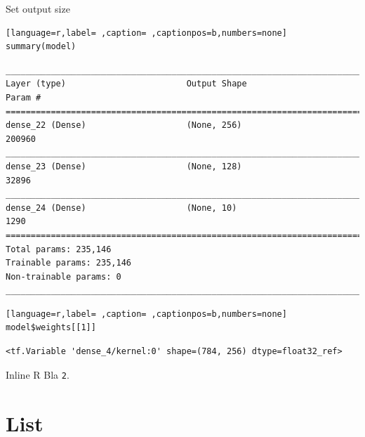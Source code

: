 \documentclass[table]{beamer}
\begin{document}
\begin{frame}[label={sec:org4520db5},fragile]{Set output size}
 \begin{lstlisting}[language=r,label= ,caption= ,captionpos=b,numbers=none]
summary(model)
\end{lstlisting}


{

\begin{verbatim}
________________________________________________________________________________
Layer (type)                        Output Shape                    Param #     
================================================================================
dense_22 (Dense)                    (None, 256)                     200960      
________________________________________________________________________________
dense_23 (Dense)                    (None, 128)                     32896       
________________________________________________________________________________
dense_24 (Dense)                    (None, 10)                      1290        
================================================================================
Total params: 235,146
Trainable params: 235,146
Non-trainable params: 0
________________________________________________________________________________
\end{verbatim}

}

\begin{lstlisting}[language=r,label= ,caption= ,captionpos=b,numbers=none]
model$weights[[1]]
\end{lstlisting}

{

\begin{verbatim}
<tf.Variable 'dense_4/kernel:0' shape=(784, 256) dtype=float32_ref>
\end{verbatim}


}
\end{frame}
\begin{frame}[label={sec:orgd67fac7},fragile]{Inline R}
 Bla \texttt{2}.
\end{frame}

\section{List}
\label{sec:org3213efb}
\end{document}
